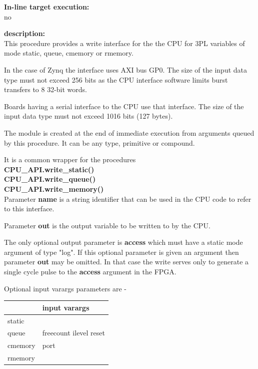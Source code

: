             {\bf In-line target execution:} \\
            no

            {\bf description:} \\
            This procedure provides a write interface for the the CPU for 
            3PL variables of mode static, queue, cmemory or rmemory.
            
            In the case of Zynq the interface uses AXI bus GP0.            
            The size of the input data type must not exceed 256 bits as the CPU
            interface software limits burst transfers to 8 32-bit words.
            
            Boards having a serial interface to the CPU use that interface.
            The size of the input data type must not exceed 1016 bits (127 bytes).
            
            The module is created at the end of immediate execution from
            arguments queued by this procedure. It can be any type, primitive or
            compound.
                        
            It is a common wrapper for the procedures \\
            {\bf CPU\_API.write\_static()}  \\
            {\bf CPU\_API.write\_queue()}  \\
            {\bf CPU\_API.write\_memory()}  \\
            
            Parameter {\bf name} is a string identifier that can be used
            in the CPU code to refer to this interface.
            
            Parameter {\bf out} is the output variable to be written to
            by the CPU.

            The only optional output parameter is {\bf access} which must have
            a static mode argument of type "log". If this optional parameter is
            given an argument then parameter {\bf out} may be omitted. In that
            case the write serves only to generate a single cycle pulse to
            the {\bf access} argument in the FPGA.
           
            Optional input varargs parameters are -
            
            \begin{tabular}{| l | l |}
            \hline
                    & input varargs             \\
            \hline \hline
            static  &                           \\
            \hline
            queue   & freecount ilevel reset    \\
            \hline
            cmemory & port                      \\
            rmemory &                           \\
            \hline
            \end{tabular}





